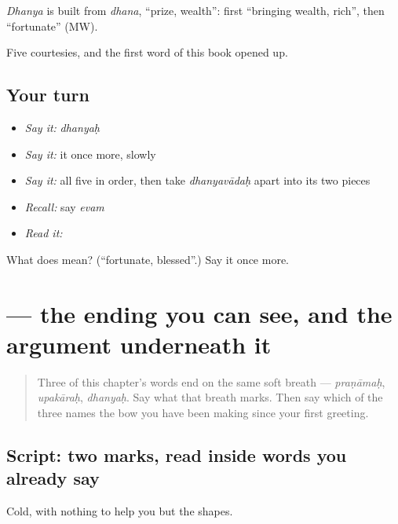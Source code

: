 \begin{cousinweb}
\emph{Dhanya} is built from \emph{dhana}, \textquotedblleft{}prize, wealth\textquotedblright{}: first \textquotedblleft{}bringing wealth, rich\textquotedblright{}, then \textquotedblleft{}fortunate\textquotedblright{} (MW).
\end{cousinweb}

\begin{grammarlens}[title={What you've built}]
Five courtesies, and the first word of this book opened up.
\end{grammarlens}

\subsection*{Your turn}
\begin{itemize}
\raggedright
  \item \emph{Say it:} \emph{dhanyaḥ}
  \item \emph{Say it:} it once more, slowly
  \item \emph{Say it:} all five in order, then take \emph{dhanyavādaḥ} apart into its two pieces
  \item \emph{Recall:} say \emph{evam}
  \item \emph{Read it:} \textbf{}
\end{itemize}

\begin{tcolorbox}[breakable,colback=teal!4,colframe=teal!35!black,title={Before you move on}]
What does  mean? (\textquotedblleft{}fortunate, blessed\textquotedblright{}.) Say it once more.
\end{tcolorbox}
\section[\texorpdfstring{\sk{धन्यः} (dhanyaḥ)}{धन्यः (dhanyaḥ)}]{ — the ending you can see, and the argument underneath it}

\label{lesson:SA-R29-second-pass-how-this-book-argues}



\begin{quote}
Three of this chapter's words end on the same soft breath — \emph{praṇāmaḥ}, \emph{upakāraḥ}, \emph{dhanyaḥ}. Say what that breath marks. Then say which of the three names the bow you have been making since your first greeting.
\end{quote}

\subsection*{Script: two marks, read inside words you already say}
Cold, with nothing to help you but the shapes.

